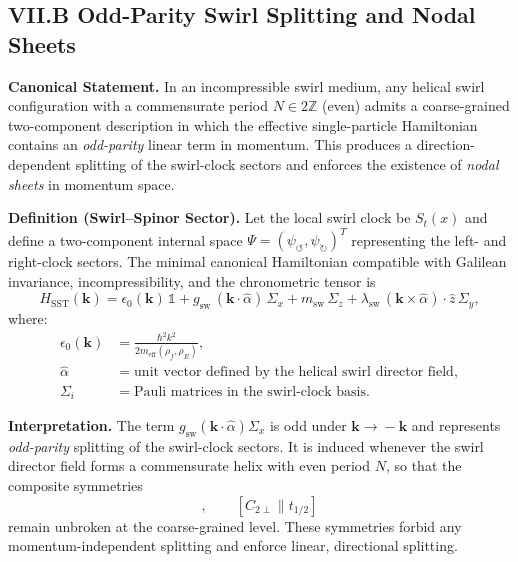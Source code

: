 \documentclass[10pt,reprint,aps,onecolumn,nofootinbib]{revtex4-2}
\begin{document}
        \subsection*{VII.B Odd-Parity Swirl Splitting and Nodal Sheets}

            \noindent
            \textbf{Canonical Statement.}
            In an incompressible swirl medium, any helical swirl configuration with a
            commensurate period $N \in 2\mathbb{Z}$ (even) admits a coarse-grained
            two-component description in which the effective single-particle Hamiltonian
            contains an \emph{odd-parity} linear term in momentum. This produces a
            direction-dependent splitting of the swirl-clock sectors and enforces the
            existence of \emph{nodal sheets} in momentum space.

            \medskip
            \noindent
            \textbf{Definition (Swirl–Spinor Sector).}
            Let the local swirl clock be $S_t(x)$ and define a two-component internal space
            $\Psi = (\psi_{\circlearrowleft},\psi_{\circlearrowright})^{T}$ representing the
            left- and right-clock sectors. The minimal canonical Hamiltonian compatible with
            Galilean invariance, incompressibility, and the chronometric tensor is
            \begin{equation}
                H_{\text{SST}}(\mathbf{k})
                = \epsilon_0(\mathbf{k})\,\mathbb{1}
                + g_{\text{sw}}\,(\mathbf{k}\cdot\hat{\alpha})\,\Sigma_x
                + m_{\text{sw}}\,\Sigma_z
                + \lambda_{\text{sw}}\,(\mathbf{k}\times\hat{\alpha})\cdot\hat{z}\,\Sigma_y ,
                \label{eq:H_SST_pwave}
            \end{equation}
            where:
            \begin{align}
                \epsilon_0(\mathbf{k}) &= \frac{\hbar^2 k^2}{2m_{\mathrm{eff}}(\rho_{\!f},\rho_{\!E})}, \\
                \hat{\alpha} &= \text{unit vector defined by the helical swirl director field}, \\
                \Sigma_i &= \text{Pauli matrices in the swirl-clock basis}.
            \end{align}

            \medskip
            \noindent
            \textbf{Interpretation.}
            The term $g_{\text{sw}}(\mathbf{k}\cdot\hat{\alpha})\Sigma_x$ is odd under
            $\mathbf{k}\!\rightarrow\!-\mathbf{k}$ and represents \emph{odd-parity}
            splitting of the swirl-clock sectors. It is induced whenever the swirl director
            field forms a commensurate helix with even period $N$, so that the composite
            symmetries
            \begin{equation}
            [T \parallel t_{1/2}], \qquad [C_{2\perp} \parallel t_{1/2}]
            \end{equation}
            remain unbroken at the coarse-grained level. These symmetries forbid any
            momentum-independent splitting and enforce linear, directional splitting.
\end{document}

